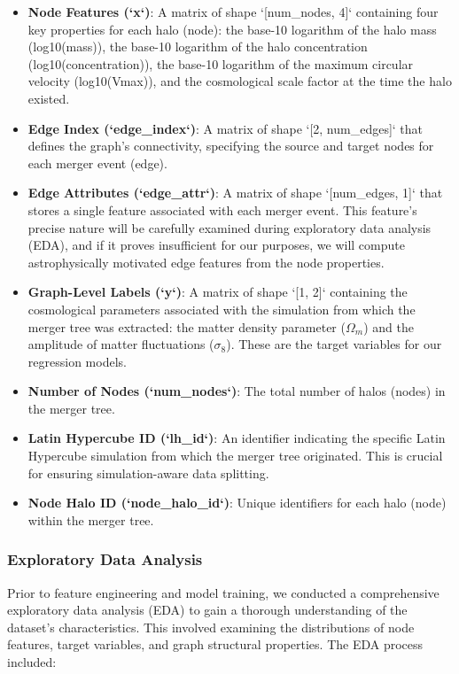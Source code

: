 \documentclass[twocolumn]{aastex631}
\begin{document}
\begin{itemize}
    \item \textbf{Node Features (`x`)}: A matrix of shape `[num\_nodes, 4]` containing four key properties for each halo (node): the base-10 logarithm of the halo mass (log10(mass)), the base-10 logarithm of the halo concentration (log10(concentration)), the base-10 logarithm of the maximum circular velocity (log10(Vmax)), and the cosmological scale factor at the time the halo existed.
    \item \textbf{Edge Index (`edge\_index`)}: A matrix of shape `[2, num\_edges]` that defines the graph's connectivity, specifying the source and target nodes for each merger event (edge).
    \item \textbf{Edge Attributes (`edge\_attr`)}: A matrix of shape `[num\_edges, 1]` that stores a single feature associated with each merger event. This feature's precise nature will be carefully examined during exploratory data analysis (EDA), and if it proves insufficient for our purposes, we will compute astrophysically motivated edge features from the node properties.
    \item \textbf{Graph-Level Labels (`y`)}: A matrix of shape `[1, 2]` containing the cosmological parameters associated with the simulation from which the merger tree was extracted: the matter density parameter ($\Omega_m$) and the amplitude of matter fluctuations ($\sigma_8$). These are the target variables for our regression models.
    \item \textbf{Number of Nodes (`num\_nodes`)}: The total number of halos (nodes) in the merger tree.
    \item \textbf{Latin Hypercube ID (`lh\_id`)}: An identifier indicating the specific Latin Hypercube simulation from which the merger tree originated. This is crucial for ensuring simulation-aware data splitting.
    \item \textbf{Node Halo ID (`node\_halo\_id`)}: Unique identifiers for each halo (node) within the merger tree.
\end{itemize}

\subsubsection{Exploratory Data Analysis}
Prior to feature engineering and model training, we conducted a comprehensive exploratory data analysis (EDA) to gain a thorough understanding of the dataset's characteristics. This involved examining the distributions of node features, target variables, and graph structural properties. The EDA process included:
\end{document}
